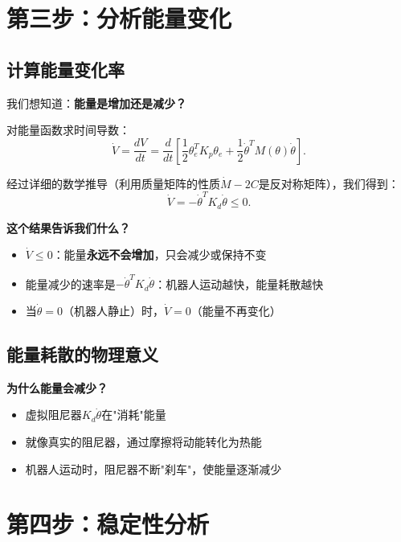 \documentclass{article}
\begin{document}
\section{第三步：分析能量变化}

\subsection{计算能量变化率}

我们想知道：\textbf{能量是增加还是减少？}

对能量函数求时间导数：
\begin{equation}
\dot{V} = \frac{dV}{dt} = \frac{d}{dt}\left[\frac{1}{2}\theta_e^T K_p\theta_e + \frac{1}{2}\dot{\theta}^T M(\theta)\dot{\theta}\right].
\end{equation}

经过详细的数学推导（利用质量矩阵的性质$\dot{M} - 2C$是反对称矩阵），我们得到：
\begin{equation}
\dot{V} = -\dot{\theta}^T K_d\dot{\theta} \leq 0. \tag{55}
\end{equation}

\textbf{这个结果告诉我们什么？}

\begin{itemize}
\item $\dot{V} \leq 0$：能量\textbf{永远不会增加}，只会减少或保持不变
\item 能量减少的速率是$-\dot{\theta}^T K_d\dot{\theta}$：机器人运动越快，能量耗散越快
\item 当$\dot{\theta} = 0$（机器人静止）时，$\dot{V} = 0$（能量不再变化）
\end{itemize}

\subsection{能量耗散的物理意义}

\textbf{为什么能量会减少？}

\begin{itemize}
\item 虚拟阻尼器$K_d\dot{\theta}$在"消耗"能量
\item 就像真实的阻尼器，通过摩擦将动能转化为热能
\item 机器人运动时，阻尼器不断"刹车"，使能量逐渐减少
\end{itemize}

\section{第四步：稳定性分析}
\end{document}
